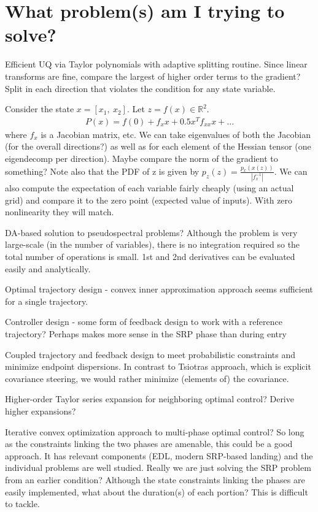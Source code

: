\documentclass[letterpaper, preprint, paper,11pt]{AAS}	%
\begin{document}
			
	\section{What problem(s) am I trying to solve?}
	Efficient UQ via Taylor polynomials with adaptive splitting routine. Since linear transforms are fine, compare the largest of higher order terms to the gradient? Split in each direction that violates the condition for any state variable. 
	
	Consider the state $x=[x_1,\ x_2]$. Let $z = f(x) \in \mathbb{R}^2$. 
	\begin{align}
	P(x) = f(0) + f_xx + 0.5x^Tf_{xx}x +\dots
	\end{align}
	where $f_x$ is a Jacobian matrix, etc. We can take eigenvalues of both the Jacobian (for the overall directions?) as well as for each element of the Hessian tensor (one eigendecomp per direction). Maybe compare the norm of the gradient to something? Note also that the PDF of z is given by $p_z(z) = \frac{p_x(x(z))}{|f_x^{-1}|} $. We can also compute the expectation of each variable fairly cheaply (using an actual grid) and compare it to the zero point (expected value of inputs). With zero nonlinearity they will match. 
	
	DA-based solution to pseudospectral problems? Although the problem is very large-scale (in the number of variables), there is no integration required so the total number of operations is small. 1st and 2nd derivatives can be evaluated easily and analytically. 
	
	Optimal trajectory design - convex inner approximation approach seems sufficient for a single trajectory. 
	
	Controller design - some form of feedback design to work with a reference trajectory? Perhaps makes more sense in the SRP phase than during entry 
	
	Coupled trajectory and feedback design to meet probabilistic constraints and minimize endpoint dispersions. In contrast to Tsiotras approach, which is explicit covariance steering, we would rather minimize (elements of) the covariance.
	
	Higher-order Taylor series expansion for neighboring optimal control? Derive higher expansions? 
	
	Iterative convex optimization approach to multi-phase optimal control? So long as the constraints linking the two phases are amenable, this could be a good approach. It has relevant components (EDL, modern SRP-based landing) and the individual problems are well studied. Really we are just solving the SRP problem from an earlier condition? Although the state constraints linking the phases are easily implemented, what about the duration(s) of each portion? This is difficult to tackle. 
	
\end{document}
